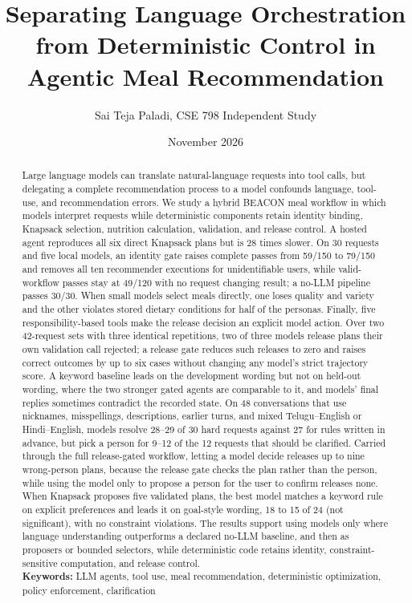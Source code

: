\documentclass[
  10pt,
  letterpaper,
]{article}
\title{Separating Language Orchestration from Deterministic Control in
Agentic Meal Recommendation}
\author{Sai Teja Paladi, CSE 798 Independent Study}
\date{November 2026}
\begin{document}
\maketitle
\begin{abstract}
Large language models can translate natural-language requests into tool
calls, but delegating a complete recommendation process to a model
confounds language, tool-use, and recommendation errors. We study a
hybrid BEACON meal workflow in which models interpret requests while
deterministic components retain identity binding, Knapsack selection,
nutrition calculation, validation, and release control. A hosted agent
reproduces all six direct Knapsack plans but is 28 times slower. On 30
requests and five local models, an identity gate raises complete passes
from 59/150 to 79/150 and removes all ten recommender executions for
unidentifiable users, while valid-workflow passes stay at 49/120 with no
request changing result; a no-LLM pipeline passes 30/30. When small
models select meals directly, one loses quality and variety and the
other violates stored dietary conditions for half of the personas.
Finally, five responsibility-based tools make the release decision an
explicit model action. Over two 42-request sets with three identical
repetitions, two of three models release plans their own validation call
rejected; a release gate reduces such releases to zero and raises
correct outcomes by up to six cases without changing any model's strict
trajectory score. A keyword baseline leads on the development wording
but not on held-out wording, where the two stronger gated agents are
comparable to it, and models' final replies sometimes contradict the
recorded state. On 48 conversations that use nicknames, misspellings,
descriptions, earlier turns, and mixed Telugu--English or
Hindi--English, models resolve 28--29 of 30 hard requests against 27 for
rules written in advance, but pick a person for 9--12 of the 12 requests
that should be clarified. Carried through the full release-gated
workflow, letting a model decide releases up to nine wrong-person plans,
because the release gate checks the plan rather than the person, while
using the model only to propose a person for the user to confirm
releases none. When Knapsack proposes five validated plans, the best
model matches a keyword rule on explicit preferences and leads it on
goal-style wording, 18 to 15 of 24 (not significant), with no constraint
violations. The results support using models only where language
understanding outperforms a declared no-LLM baseline, and then as
proposers or bounded selectors, while deterministic code retains
identity, constraint-sensitive computation, and release control.\\
\textbf{Keywords:} LLM agents, tool use, meal recommendation,
deterministic optimization, policy enforcement, clarification
\end{abstract}
\end{document}
